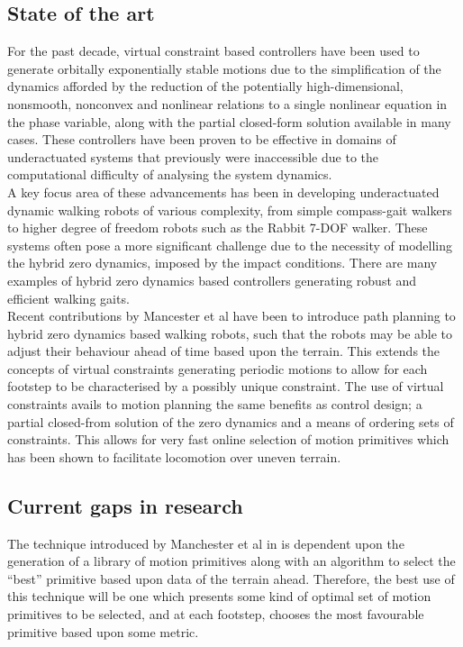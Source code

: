 \subsection{State of the art}
For the past decade, virtual constraint based controllers have been used to generate orbitally exponentially stable motions due to the simplification of the dynamics afforded by the reduction of the potentially high-dimensional, nonsmooth, nonconvex and  nonlinear relations to a single nonlinear equation in the phase variable, along with the partial closed-form solution available in many cases. These controllers have been proven to be effective in domains of underactuated systems that previously were inaccessible due to the computational difficulty of analysing the system dynamics. \\

A key focus area of these advancements has been in developing underactuated dynamic walking robots of various complexity, from simple compass-gait walkers to higher degree of freedom robots such as the Rabbit 7-DOF walker. These systems often pose a more significant challenge due to the necessity of modelling the hybrid zero dynamics, imposed by the impact conditions. There are many examples of hybrid zero dynamics based controllers generating robust and efficient walking gaits. \\

Recent contributions by Mancester et al have been to introduce path planning to hybrid zero dynamics based walking robots, such that the robots may be able to adjust their behaviour ahead of time based upon the terrain. This extends the concepts of virtual constraints generating periodic motions to allow for each footstep to be characterised by a possibly unique constraint. The use of virtual constraints avails to motion planning the same benefits as control design; a partial closed-from solution of the zero dynamics and a means of ordering sets of constraints. This allows for very fast online selection of motion primitives which has been shown to facilitate locomotion over uneven terrain.

\subsection{Current gaps in research}
The technique introduced by Manchester et al in \cite{manchester13planning} is dependent upon the generation of a library of motion primitives along with an algorithm to select the ``best'' primitive based upon data of the terrain ahead. Therefore, the best use of this technique will be one which presents some kind of optimal set of motion primitives to be selected, and at each footstep, chooses the most favourable primitive based upon some metric. \\

